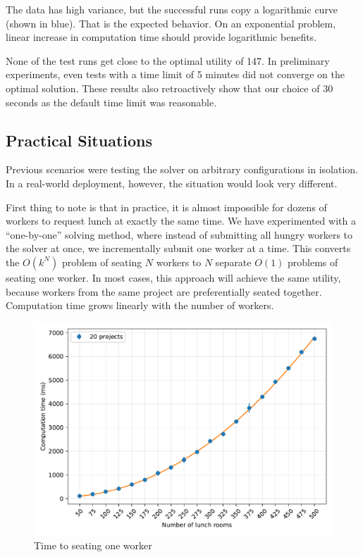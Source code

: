 The data has high variance, but the successful runs copy a logarithmic curve (shown in
blue). That is the expected behavior. On an exponential problem, linear increase in
computation time should provide logarithmic benefits.

None of the test runs get close to the optimal utility of 147. In preliminary
experiments, even tests with a time limit of 5 minutes did not converge on the optimal
solution. These results also retroactively show that our choice of 30 seconds as the
default time limit was reasonable.


\subsection{Practical Situations}
\label{eval:example:practical}

Previous scenarios were testing the solver on arbitrary configurations in isolation. In
a real-world deployment, however, the situation would look very different.

First thing to note is that in practice, it is almost impossible for dozens of workers
to request lunch at exactly the same time. We have experimented with a ``one-by-one''
solving method, where instead of submitting all hungry workers to the solver at once, we
incrementally submit one worker at a time. This converts the $O(k^N)$ problem of seating
$N$ workers to $N$ separate $O(1)$ problems of seating one worker. In most cases, this
approach will achieve the same utility, because workers from the same project are
preferentially seated together. Computation time grows linearly with the number of
workers.

\begin{figure}[ht]
    \centering
    \includegraphics[width=1\linewidth]{img/workers-oneworker.pdf}
    \caption{Time to seating one worker}
    \label{fig:workers-oneworker}
\end{figure}

